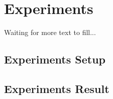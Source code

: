\section{Experiments}

Waiting for more text to fill...
\subsection{Experiments Setup}
\subsection{Experiments Result}
